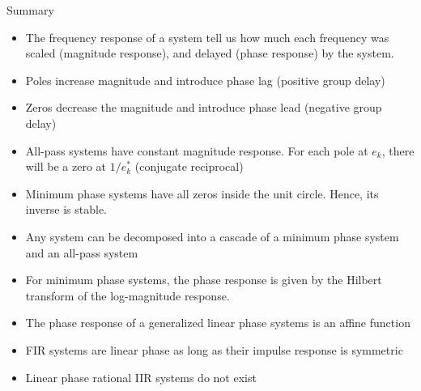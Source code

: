 \documentclass[10pt, aspectratio=169]{beamer}
\begin{document}
\begin{frame}{Summary}
\begin{itemize}
	\item The frequency response of a system tell us how much each frequency was scaled (magnitude response), and delayed (phase response) by the system.
	\item Poles increase magnitude and introduce phase lag (positive group delay)
	\item Zeros decrease the magnitude and introduce phase lead (negative group delay)
	\item All-pass systems have constant magnitude response. For each pole at $e_k$, there will be a zero at $1/e^*_k$ (conjugate reciprocal)
	\item Minimum phase systems have all zeros inside the unit circle. Hence, its inverse is stable.
	\item Any system can be decomposed into a cascade of a minimum phase system and an all-pass system
	\item For minimum phase systems, the phase response is given by the Hilbert transform of the log-magnitude response. 
	\item The phase response of a generalized linear phase systems is an affine function
	\item FIR systems are linear phase as long as their impulse response is symmetric
	\item Linear phase rational IIR systems do not exist
\end{itemize}
\end{frame}
\end{document}
